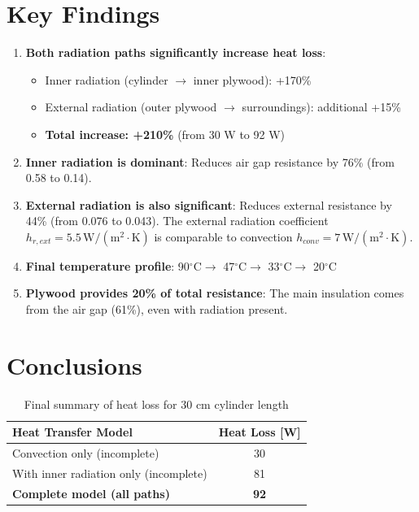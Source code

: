 \documentclass[11pt]{article}
\newcommand{\degC}{$^\circ$C}
\newcommand{\unit}[1]{\,\mathrm{#1}}
\begin{document}
\section{Key Findings}

\begin{enumerate}
    \item \textbf{Both radiation paths significantly increase heat loss}:
    \begin{itemize}
        \item Inner radiation (cylinder $\to$ inner plywood): +170\%
        \item External radiation (outer plywood $\to$ surroundings): additional +15\%
        \item \textbf{Total increase: +210\%} (from 30 W to 92 W)
    \end{itemize}

    \item \textbf{Inner radiation is dominant}: Reduces air gap resistance by 76\% (from 0.58 to 0.14).

    \item \textbf{External radiation is also significant}: Reduces external resistance by 44\% (from 0.076 to 0.043). The external radiation coefficient $h_{r,ext} = 5.5\unit{W/(m^2 \cdot K)}$ is comparable to convection $h_{conv} = 7\unit{W/(m^2 \cdot K)}$.

    \item \textbf{Final temperature profile}: 90\degC $\to$ 47\degC $\to$ 33\degC $\to$ 20\degC

    \item \textbf{Plywood provides 20\% of total resistance}: The main insulation comes from the air gap (61\%), even with radiation present.
\end{enumerate}

\section{Conclusions}

\begin{table}[H]
\centering
\caption{Final summary of heat loss for 30 cm cylinder length}
\begin{tabular}{lc}
\toprule
\textbf{Heat Transfer Model} & \textbf{Heat Loss [W]} \\
\midrule
Convection only (incomplete) & 30 \\
With inner radiation only (incomplete) & 81 \\
\textbf{Complete model (all paths)} & \textbf{92} \\
\bottomrule
\end{tabular}
\end{table}
\end{document}
